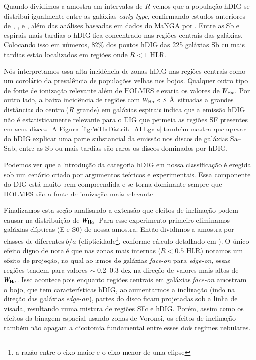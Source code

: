 Quando dividimos a amostra em intervalos de $R$ vemos que a população hDIG se distribui igualmente entre as galáxias {\em early-type}, confirmando estudos anteriores de \citet{Kehrig.etal.2012}, \citet{Singh.etal.2013}, e \citet{Gomes.etal.2016b}, além das análises baseadas em dados do MaNGA por \citet{Belfiore.etal.2016, Belfiore.etal.2017}. Entre as Sb e espirais mais tardias o hDIG fica concentrado nas regiões centrais das galáxias. Colocando isso em números, 82\% dos pontos hDIG das 225 galáxias Sb ou mais tardias estão localizados em regiões onde $R < 1$ HLR.

Nós interpretamos essa alta incidência de zonas hDIG nas regiões centrais como um corolário da prevalência de populações velhas nos bojos.
Qualquer outro tipo de fonte de ionização relevante
além de HOLMES
elevaria os valores de $W_{\Ha}$. Por outro lado, a baixa incidência de regiões com $W_{\Ha} < 3$ \AA\ situadas a grandes distâncias do centro ($R$ grande) em galáxias espirais indica que a emissão hDIG não é estatisticamente relevante para o DIG que permeia as regiões SF presentes em seus discos. A Figura \ref{fig:WHaDistrib_ALLgals} também mostra que apesar do hDIG explicar uma parte substancial da emissão nos discos de galáxias Sa--Sab, entre as Sb ou mais tardias são raros os discos dominados por hDIG.

Podemos ver que a introdução da categoria hDIG em nossa classificação é eregida sob um cenário criado por argumentos teóricos e experimentais. Essa componente do DIG está muito bem compreendida e se torna dominante sempre que HOLMES são a fonte de ionização mais relevante.

Finalizamos esta seção analisando a extensão que efeitos de inclinação podem causar na distribuição de $W_{\Ha}$. Para esse experimento primeiro eliminamos galáxias elípticas (E e S0) de nossa amostra. Então dividimos a amostra por classes de diferentes $b/a$ (elipticidade\footnote{a razão entre o eixo maior e o eixo menor de uma elipse}, conforme cálculo detalhado em \citealt{deAmorim.etal.2017}). O único efeito digno de nota é que nas zonas mais internas ($R < 0.5$ HLR) notamos um efeito de projeção, no qual ao irmos de galáxias {\em face-on} para {\em edge-on}, essas regiões tendem para valores $\sim$ 0.2--0.3 dex na direção de valores mais altos de $W_{\Ha}$. Isso acontece pois enquanto regiões centrais em galáxias {\em face-on} amostram o bojo, que tem características hDIG, ao aumentarmos a inclinação (indo na direção das galáxias {\em edge-on}), partes do disco ficam projetadas sob a linha de visada, resultando numa mistura de regiões SFc e hDIG. Porém, assim como os efeitos da binagem espacial usando zonas de Voronoi, os efeitos de inclinação também não apagam a dicotomia fundamental entre esses dois regimes nebulares.


